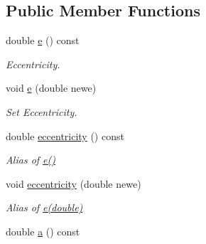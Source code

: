 \subsection*{Public Member Functions}
\begin{DoxyCompactItemize}
\item 
\hypertarget{class_orbit3_d_a35c5a9ed4b3cce05f74b35d0d430d388}{double \hyperlink{class_orbit3_d_a35c5a9ed4b3cce05f74b35d0d430d388}{e} () const }\label{class_orbit3_d_a35c5a9ed4b3cce05f74b35d0d430d388}

\begin{DoxyCompactList}\small\item\em Eccentricity. \end{DoxyCompactList}\item 
\hypertarget{class_orbit3_d_a35e1c0ac75c987273e6639fe800c941d}{void \hyperlink{class_orbit3_d_a35e1c0ac75c987273e6639fe800c941d}{e} (double newe)}\label{class_orbit3_d_a35e1c0ac75c987273e6639fe800c941d}

\begin{DoxyCompactList}\small\item\em Set Eccentricity. \end{DoxyCompactList}\item 
\hypertarget{class_orbit3_d_a4bbfb67fe34d59daf768c92ca782d80e}{double \hyperlink{class_orbit3_d_a4bbfb67fe34d59daf768c92ca782d80e}{eccentricity} () const }\label{class_orbit3_d_a4bbfb67fe34d59daf768c92ca782d80e}

\begin{DoxyCompactList}\small\item\em Alias of \hyperlink{class_orbit3_d_a35c5a9ed4b3cce05f74b35d0d430d388}{e()} \end{DoxyCompactList}\item 
\hypertarget{class_orbit3_d_ae566d2b93620b9427b123decf41ef171}{void \hyperlink{class_orbit3_d_ae566d2b93620b9427b123decf41ef171}{eccentricity} (double newe)}\label{class_orbit3_d_ae566d2b93620b9427b123decf41ef171}

\begin{DoxyCompactList}\small\item\em Alias of \hyperlink{class_orbit3_d_a35e1c0ac75c987273e6639fe800c941d}{e(double)} \end{DoxyCompactList}\item 
\hypertarget{class_orbit3_d_a0a08d23ce456665ac235bc6aac516868}{double \hyperlink{class_orbit3_d_a0a08d23ce456665ac235bc6aac516868}{a} () const }\label{class_orbit3_d_a0a08d23ce456665ac235bc6aac516868}


\end{DoxyCompactItemize}

